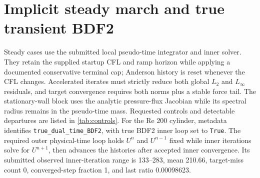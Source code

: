 \documentclass[11pt]{article}
\begin{document}
\section{Implicit steady march and true transient BDF2}
Steady cases use the submitted local pseudo-time integrator and inner solver.  They retain the supplied startup CFL and ramp horizon while applying a documented conservative terminal cap; Anderson history is reset whenever the CFL changes.  Accelerated iterates must strictly reduce both global $L_2$ and $L_\infty$ residuals, and target convergence requires both norms plus a stable force tail.  The stationary-wall block uses the analytic pressure-flux Jacobian while its spectral radius remains in the pseudo-time mass.  Requested controls and detectable departures are listed in \cref{tab:controls}.  For the Re 200 cylinder, metadata identifies \texttt{true\_dual\_time\_BDF2}, with true BDF2 inner loop set to \texttt{True}.  The required outer physical-time loop holds $U^n$ and $U^{n-1}$ fixed while inner iterations solve for $U^{n+1}$, then advances the histories after accepted inner convergence.  Its submitted observed inner-iteration range is 133--283, mean 210.66, target-miss count 0, converged-step fraction 1, and last ratio 0.00098623.
\end{document}
